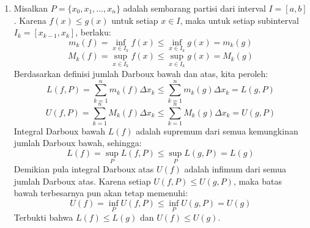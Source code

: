 \documentclass[11pt,letterpaper]{article}
\begin{document}
\begin{enumerate}
\begin{enumerate}[label=\alph*)]
          \item Partisi $\mathcal{P}_3 = \{0, \frac{1}{2}, \frac{3}{2}, 2\}$ dengan tanda di titik tengah ($t_i = \frac{x_{i-1} + x_i}{2}$).
                \begin{itemize}
                  \item Subinterval 1: $[0, \frac{1}{2}]$, $\Delta x_1 = \frac{1}{2}$, $t_1 = \frac{1}{4} \implies f\left(\frac{1}{4}\right) = \left(\frac{1}{4}\right)^2 + 2\left(\frac{1}{4}\right) + 3 = \frac{1}{16} + \frac{1}{2} + 3 = \frac{57}{16}$
                  \item Subinterval 2: $[\frac{1}{2}, \frac{3}{2}]$, $\Delta x_2 = 1$, $t_2 = 1 \implies f(1) = 6$
                  \item Subinterval 3: $[\frac{3}{2}, 2]$, $\Delta x_3 = \frac{1}{2}$, $t_3 = \frac{7}{4} \implies f\left(\frac{7}{4}\right) = \left(\frac{7}{4}\right)^2 + 2\left(\frac{7}{4}\right) + 3 = \frac{49}{16} + \frac{7}{2} + 3 = \frac{153}{16}$
                \end{itemize}
                \begin{align*}
                  S(f, \mathcal{P}_3) & = f\left(\frac{1}{4}\right)\left(\frac{1}{2}\right) + f(1)(1) + f\left(\frac{7}{4}\right)\left(\frac{1}{2}\right) = \left(\frac{57}{16}\right)\left(\frac{1}{2}\right) + (6)(1) + \left(\frac{153}{16}\right)\left(\frac{1}{2}\right) \\
                                      & = \frac{57}{32} + 6 + \frac{153}{32} = \frac{210}{32} + \frac{192}{32} = \frac{402}{32} = \frac{201}{16}
                \end{align*}
        \end{enumerate}

  \item Misalkan $P = \{x_0, x_1, \dots, x_n\}$ adalah sembarang partisi dari interval $I = [a,b]$. Karena $f(x) \leq g(x)$ untuk setiap $x \in I$, maka untuk setiap subinterval $I_k = [x_{k-1}, x_k]$, berlaku:
        \[ m_k(f) = \inf_{x \in I_k} f(x) \leq \inf_{x \in I_k} g(x) = m_k(g) \]
        \[ M_k(f) = \sup_{x \in I_k} f(x) \leq \sup_{x \in I_k} g(x) = M_k(g) \]
        Berdasarkan definisi jumlah Darboux bawah dan atas, kita peroleh:
        \[ L(f, P) = \sum_{k=1}^n m_k(f) \Delta x_k \leq \sum_{k=1}^n m_k(g) \Delta x_k = L(g, P) \]
        \[ U(f, P) = \sum_{k=1}^n M_k(f) \Delta x_k \leq \sum_{k=1}^n M_k(g) \Delta x_k = U(g, P) \]
        Integral Darboux bawah $L(f)$ adalah supremum dari semua kemungkinan jumlah Darboux bawah, sehingga:
        \[ L(f) = \sup_P L(f, P) \leq \sup_P L(g, P) = L(g) \]
        Demikian pula integral Darboux atas $U(f)$ adalah infimum dari semua jumlah Darboux atas. Karena setiap $U(f, P) \leq U(g, P)$, maka batas bawah terbesarnya pun akan tetap memenuhi:
        \[ U(f) = \inf_P U(f, P) \leq \inf_P U(g, P) = U(g) \]
        Terbukti bahwa $L(f) \leq L(g)$ dan $U(f) \leq U(g)$.


\end{enumerate}
\end{document}
